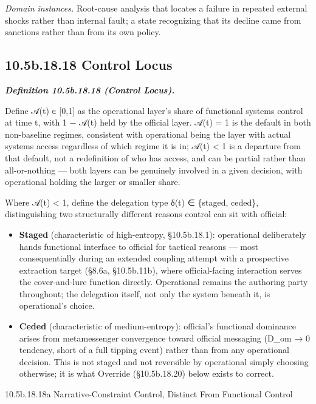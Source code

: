 \documentclass[
]{article}
\begin{document}
\emph{Domain instances.} Root-cause analysis that locates a failure in
repeated external shocks rather than internal fault; a state recognizing
that its decline came from sanctions rather than from its own policy.

\hypertarget{b.18.18-control-locus}{%
\subsection{10.5b.18.18 Control Locus}\label{b.18.18-control-locus}}

\emph{\textbf{Definition 10.5b.18.18 (Control Locus).}}

Define 𝒜(t) ∈ {[}0,1{]} as the operational layer's share of functional
systems control at time t, with 1 − 𝒜(t) held by the official layer.
𝒜(t) = 1 is the default in both non-baseline regimes, consistent with
operational being the layer with actual systems access regardless of
which regime it is in; 𝒜(t) \textless{} 1 is a departure from that
default, not a redefinition of who has access, and can be partial rather
than all-or-nothing --- both layers can be genuinely involved in a given
decision, with operational holding the larger or smaller share.

Where 𝒜(t) \textless{} 1, define the delegation type δ(t) ∈ \{staged,
ceded\}, distinguishing two structurally different reasons control can
sit with official:

\begin{itemize}
\item
  \textbf{Staged} (characteristic of high-entropy, §10.5b.18.1):
  operational deliberately hands functional interface to official for
  tactical reasons --- most consequentially during an extended coupling
  attempt with a prospective extraction target (§8.6a, §10.5b.11b),
  where official-facing interaction serves the cover-and-lure function
  directly. Operational remains the authoring party throughout; the
  delegation itself, not only the system beneath it, is operational's
  choice.
\item
  \textbf{Ceded} (characteristic of medium-entropy): official's
  functional dominance arises from metamessenger convergence toward
  official messaging (D\_om → 0 tendency, short of a full tipping event)
  rather than from any operational decision. This is not staged and not
  reversible by operational simply choosing otherwise; it is what
  Override (§10.5b.18.20) below exists to correct.
\end{itemize}

10.5b.18.18a Narrative-Constraint Control, Distinct From Functional
Control
\end{document}

